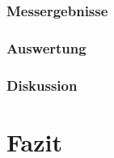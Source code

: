 \documentclass[12pt,a4paper]{article}
\begin{document}
\subsubsection*{Messergebnisse}
\subsubsection*{Auswertung}
\subsubsection*{Diskussion}
\section{Fazit}
\end{document}

